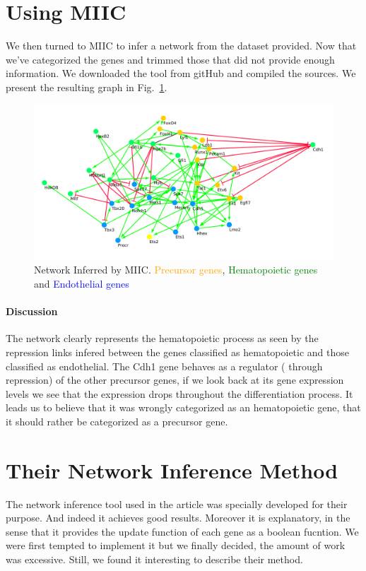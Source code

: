 \documentclass[a4paper,12pt]{book}
\theoremstyle{break}
\begin{document}
\section*{Using MIIC}
	We then turned to MIIC to infer a network from the dataset provided. Now that we've categorized the genes and trimmed those that did not provide enough information. We downloaded the tool from gitHub and compiled the sources. We present the resulting graph in Fig.~\ref{fig:miicnetwork}.
	\begin{figure}[h!]
		\centering
		\includegraphics[width =\linewidth]{../Datasets/miic-trimmed/miic-trimmed.png}
		\caption{Network Inferred by MIIC. \textcolor{orange}{Precursor genes}, \textcolor{green}{ Hematopoietic genes} and  \textcolor{blue}{Endothelial genes}}
		\label{fig:miicnetwork}
	\end{figure}

\paragraph{Discussion }The network clearly represents the hematopoietic process as seen by the repression links  infered between the genes classified as hematopoietic and those classified as endothelial. The Cdh1 gene behaves as a regulator ( through repression) of the other precursor genes, if we look back at its gene expression levels we see that the expression drops throughout the differentiation process. It leads us to believe that it was wrongly categorized as an hematopoietic gene, that it should rather be categorized as a precursor gene.

\section*{Their Network Inference Method}
The network inference tool used in the article was specially developed for their purpose. And indeed it achieves good results. Moreover it is explanatory, in the sense that it provides the update function of each gene as a boolean fucntion. We were first tempted to implement it but we finally decided, the amount of work was excessive. Still, we found it interesting to describe their method.
\end{document}
